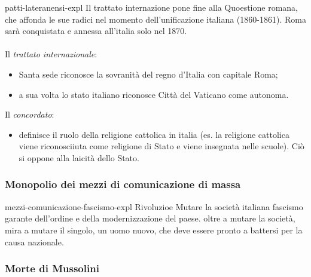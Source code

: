 \documentclass[preview]{standalone}
\begin{document}
\begin{snippet}{patti-lateranensi-expl}
    Il trattato internazione pone fine alla Quoestione romana, che affonda
    le sue radici nel momento dell'unificazione italiana (1860-1861).
    Roma sarà conquistata e annessa all'italia solo nel 1870.
    \\\\
    Il \textit{trattato internazionale}:
    \begin{itemize}
        \item Santa sede riconosce la sovranità del regno d'Italia con capitale Roma;
        \item a sua volta lo stato italiano riconosce Città del Vaticano come autonoma.
    \end{itemize}
    Il \textit{concordato}:
    \begin{itemize}
        \item definisce il ruolo della religione cattolica in italia (es. la religione cattolica
        viene riconosciiuta come religione di Stato e viene insegnata nelle scuole).
        Ciò si oppone alla laicità dello Stato.
    \end{itemize}
\end{snippet}

\subsubsection{Monopolio dei mezzi di comunicazione di massa}

\begin{snippet}{mezzi-comunicazione-fascismo-expl}
    Rivoluzioe \textrightarrow Mutare la società italiana \textrightarrow fascismo garante
    dell'ordine e della modernizzazione del paese.
    oltre a mutare la società, mira a mutare il singolo, un uomo nuovo, che deve
    essere pronto a battersi per la causa nazionale.
\end{snippet}

\subsubsection{Morte di Mussolini}

\end{document}
